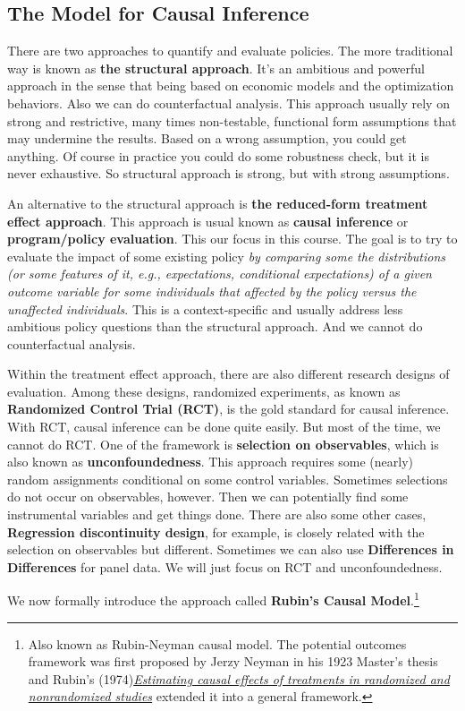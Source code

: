 \documentclass[11pt,a4paper]{amsart}
\theoremstyle{plain}
\theoremstyle{definition}
\begin{document}
\subsection{The Model for Causal Inference}\hfill\par %
	 There are two approaches to quantify and evaluate policies. The more traditional way is known as \textbf{the structural approach}. It's an ambitious and powerful approach in the sense that being based on economic models and the optimization behaviors. Also we can do counterfactual analysis. This approach usually rely on strong and restrictive, many times non-testable, functional form assumptions that may undermine the results. Based on a wrong assumption, you could get anything. Of course in practice you could do some robustness check, but it is never exhaustive. So structural approach is strong, but with strong assumptions. \par 
	An alternative to the structural approach is \textbf{the reduced-form treatment eﬀect approach}. This approach is usual known as \textbf{causal inference} or \textbf{program/policy evaluation}. This our focus in this course. The goal is to try to evaluate the impact of some existing policy \emph{by comparing some the distributions (or some features of it, e.g., expectations, conditional expectations) of a given outcome variable for some individuals that affected by the policy versus the unaffected individuals}. This is a context-speciﬁc and usually address less ambitious policy questions than the structural approach. And we cannot do counterfactual analysis. \par 
	Within the treatment eﬀect approach, there are also different research designs of evaluation. Among these designs, randomized experiments, as known as \textbf{Randomized Control Trial (RCT)}, is the gold standard for causal inference. With RCT, causal inference can be done quite easily. But most of the time, we cannot do RCT. One of the framework is \textbf{selection on observables}, which is also known as \textbf{unconfoundedness}. This approach requires some (nearly) random assignments conditional on some  control variables. Sometimes selections do not occur on observables, however. Then we can potentially find some instrumental variables and get things done. There are also some other cases, \textbf{Regression discontinuity design}, for example, is closely related with the selection on observables but different. Sometimes we can also use \textbf{Differences in Differences} for panel data. We will just focus on RCT and unconfoundedness.\par 
	We now formally introduce the approach called \textbf{Rubin's Causal Model}.\footnote{Also known as Rubin-Neyman causal model. The potential outcomes framework was ﬁrst proposed by Jerzy Neyman in his 1923 Master’s thesis and Rubin's (1974)\href{http://www.fsb.muohio.edu/lij14/420_paper_Rubin74.pdf}{\textit{Estimating causal effects of treatments in randomized and nonrandomized studies}} extended it into a general framework.} 
	
\end{document}
